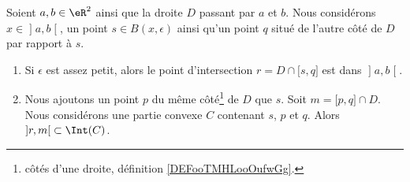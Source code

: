 \begin{lemma}	\label{LEMooAEMNooDgdLzk}
	Soient \( a,b\in \eR^2\) ainsi que la droite \( D\) passant par \( a\) et \( b\). Nous considérons \( x\in \mathopen] a,b\mathclose[\), un point \( s\in B(x,\epsilon)\) ainsi qu'un point \( q\) situé de l'autre côté de \( D\) par rapport à \( s\).
	\begin{enumerate}
		\item		\label{ITEMooBWYLooOBLPhR}
		      Si \( \epsilon\) est assez petit, alors le point d'intersection \( r=D\cap \mathopen[ s,q\mathclose]\) est dans \( \mathopen] a,b\mathclose[\).
		\item		\label{ITEMooFQDJooSdsJLu}
		      Nous ajoutons un point \( p\) du même côté\footnote{côtés d'une droite, définition \ref{DEFooTMHLooOufwGg}.} de \( D\) que \( s\). Soit \( m=\mathopen[ p,q\mathclose]\cap D\). Nous considérons une partie convexe \( C\) contenant \( s\), \( p\) et \( q\). Alors \( \mathopen] r,m\mathclose[\subset \Int(C)\).
	\end{enumerate}
\end{lemma}

